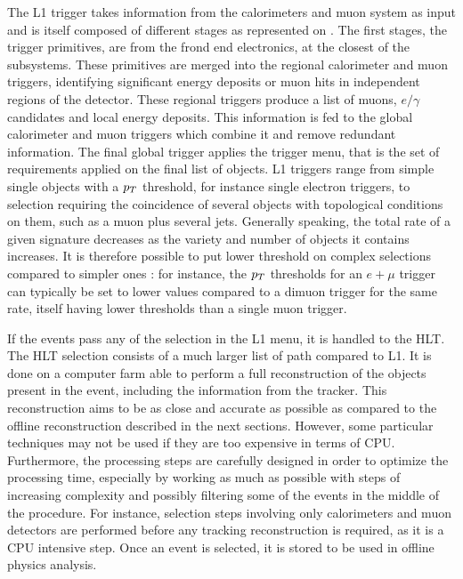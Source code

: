         The L1 trigger takes information from the calorimeters and muon system as input
        and is itself composed of different stages as
        represented on . The first stages, the trigger primitives,
        are from the frond end electronics, at the closest of the subsystems.
        These primitives are merged into the regional calorimeter and muon triggers,
        identifying significant energy deposits or muon hits in independent regions of the
        detector. These regional triggers produce a list of muons, $e/\gamma$ candidates
        and local energy deposits. This information is fed to the global calorimeter and
        muon triggers which combine it and remove redundant information. The final global trigger applies
        the trigger menu, that is the set of requirements applied on the final list of
        objects. L1 triggers range from simple single objects with a $p_T$ threshold,
        for instance single electron triggers, to
        selection requiring the coincidence of several objects with topological conditions
        on them, such as a muon plus several jets. Generally speaking, the total rate of
        a given signature decreases as the variety and number of objects it contains increases.
        It is therefore possible to put lower threshold on complex selections compared to
        simpler ones : for instance, the $p_T$ thresholds for an $e+\mu$ trigger can typically
        be set to lower values compared to a dimuon trigger for the same rate, itself having
        lower thresholds than a single muon trigger.

        If the events pass any of the selection in the L1 menu, it is handled to the HLT.
        The HLT selection consists of a much larger list of path compared to L1.
        It is done on a computer farm able to perform a full reconstruction
        of the objects present in the event, including the information from the tracker.
        This reconstruction aims to be as close and accurate as possible as compared to the
        offline reconstruction described in the next sections.
        However, some particular techniques may not be used if they are too expensive in
        terms of CPU. Furthermore, the processing steps are carefully designed in order to
        optimize the processing time, especially by working as much as possible with steps
        of increasing complexity and possibly filtering some of the events in the middle
        of the procedure. For instance, selection steps involving only calorimeters and
        muon detectors are performed before any tracking reconstruction is required, as it
        is a CPU intensive step. Once an event is selected, it is stored to be used in
        offline physics analysis.

